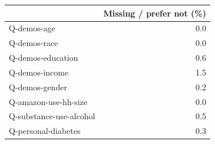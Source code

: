 \begin{tabular}{lr}
\toprule
 & Missing / prefer not (\%) \\
\midrule
Q-demos-age & 0.0 \\
Q-demos-race & 0.0 \\
Q-demos-education & 0.6 \\
Q-demos-income & 1.5 \\
Q-demos-gender & 0.2 \\
Q-amazon-use-hh-size & 0.0 \\
Q-substance-use-alcohol & 0.5 \\
Q-personal-diabetes & 0.3 \\
\bottomrule
\end{tabular}
